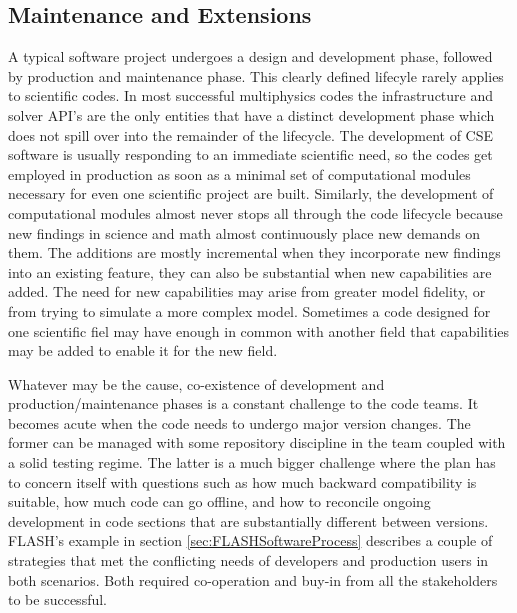\subsection{Maintenance and Extensions}
\label{sec:maintain}
A typical software project undergoes a design and development phase,
followed by production and maintenance phase. This clearly
defined lifecyle rarely applies to scientific codes. In most successful multiphysics
codes the infrastructure and solver API's are the only entities that
have a distinct development phase which does not spill over into the
remainder of the lifecycle.  The development of CSE software is
usually responding to an immediate scientific need, so the codes get
employed in production as soon as a minimal set of computational
modules necessary for even one scientific project are
built. Similarly, the development of computational modules almost
never stops all through the code lifecycle because new findings in science
and math almost continuously place new demands on them. The additions
are mostly incremental when they incorporate new findings into an
existing feature, they can also be substantial when new capabilities
are added. The need for new capabilities may arise from 
greater model fidelity, or from trying to simulate a more complex
model. Sometimes a code designed for one scientific fiel may have
enough in common with another field that capabilities may be added to
enable it for the new field.   

Whatever may be the cause, co-existence of development and
production/maintenance phases is a constant challenge to the code
teams. It becomes acute when the code needs to undergo major version
changes. The former can be managed with some repository
discipline in the team coupled with a solid testing regime. The latter
is a much bigger challenge where the plan has to concern itself with
questions such as how much backward compatibility is suitable, how
much code can go offline, and how to reconcile ongoing development in
code sections that are substantially different between versions.
FLASH's example in section \ref{sec:FLASHSoftwareProcess} describes
a couple of strategies that met the conflicting needs of developers and
production users in both scenarios. Both required co-operation and
buy-in from all the stakeholders to be successful. 

